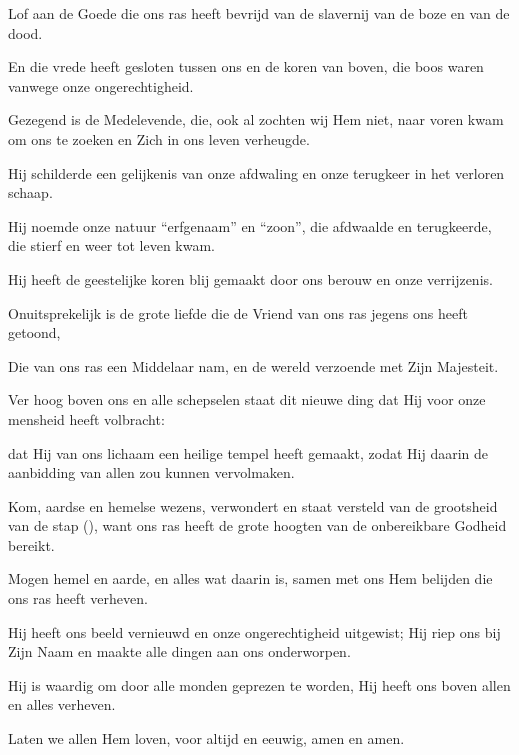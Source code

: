 \documentclass[12pt,twoside,a5paper]{article}
\begin{document}


\vspace{\parskip}



\begin{halfparskip}
  Lof aan de Goede die ons ras heeft bevrijd van de slavernij van de boze en van de dood.

  En die vrede heeft gesloten tussen ons en de koren van boven, die boos waren vanwege onze ongerechtigheid.

  Gezegend is de Medelevende, die, ook al zochten wij Hem niet, naar voren kwam om ons te zoeken en Zich in ons leven verheugde.

  Hij schilderde een gelijkenis van onze afdwaling en onze terugkeer in het verloren schaap.

  Hij noemde onze natuur ``erfgenaam'' en ``zoon'', die afdwaalde en terugkeerde, die stierf en weer tot leven kwam.

  Hij heeft de geestelijke koren blij gemaakt door ons berouw en onze verrijzenis.

  Onuitsprekelijk is de grote liefde die de Vriend van ons ras jegens ons heeft getoond,

  Die van ons ras een Middelaar nam, en de wereld verzoende met Zijn Majesteit.

  Ver hoog boven ons en alle schepselen staat dit nieuwe ding dat Hij voor onze mensheid heeft volbracht:

  dat Hij van ons lichaam een heilige tempel heeft gemaakt, zodat Hij daarin de aanbidding van allen zou kunnen vervolmaken.

  Kom, aardse en hemelse wezens, verwondert en staat versteld van de grootsheid van de stap (), want ons ras heeft de grote hoogten van de onbereikbare Godheid bereikt.

  Mogen hemel en aarde, en alles wat daarin is, samen met ons Hem belijden die ons ras heeft verheven.

  Hij heeft ons beeld vernieuwd en onze ongerechtigheid uitgewist; Hij riep ons bij Zijn Naam en maakte alle dingen aan ons onderworpen.

  Hij is waardig om door alle monden geprezen te worden, Hij heeft ons boven allen en alles verheven.

  Laten we allen Hem loven, voor altijd en eeuwig, amen en amen.
\end{halfparskip}
\end{document}
